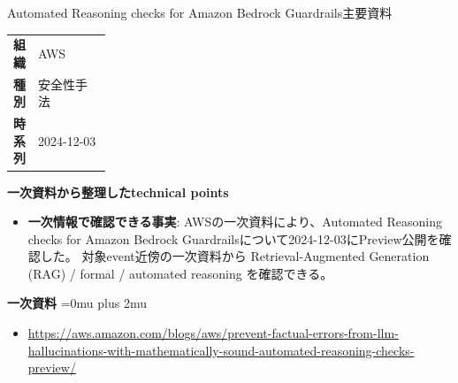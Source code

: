 \begin{technicalnote}{Automated Reasoning checks for Amazon Bedrock Guardrails}{主要資料}
\begingroup
\begin{tabularx}{\linewidth}{@{}>{\bfseries}p{0.22\linewidth}X@{}}
組織 & AWS \\
種別 & 安全性手法 \\
時系列 & 2024-12-03 \\
\end{tabularx}
\smallskip
{\bfseries 一次資料から整理したtechnical points}
\begin{itemize}[leftmargin=1.5em,itemsep=0.35em]
\item \textbf{一次情報で確認できる事実}: AWSの一次資料により、Automated Reasoning checks for Amazon Bedrock Guardrailsについて2024-12-03にPreview公開を確認した。 対象event近傍の一次資料から Retrieval-Augmented Generation (RAG) / formal / automated reasoning を確認できる。
\end{itemize}
\begin{minipage}{\linewidth}
\begin{samepage}
{\bfseries 一次資料}
\begingroup\sloppy
\Urlmuskip=0mu plus 2mu\relax
\begin{itemize}[leftmargin=1.5em,itemsep=0.25em]
\item {\scriptsize\url{https://aws.amazon.com/blogs/aws/prevent-factual-errors-from-llm-hallucinations-with-mathematically-sound-automated-reasoning-checks-preview/}}
\end{itemize}
\endgroup
\end{samepage}
\end{minipage}
\endgroup
\end{technicalnote}
\medskip

